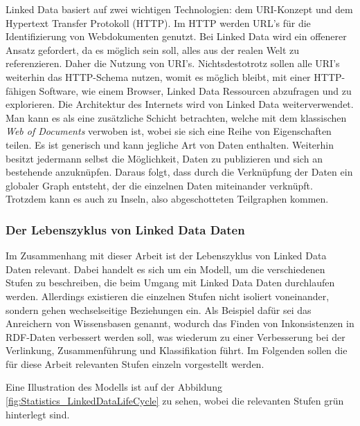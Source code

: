 \documentclass[11pt]{article}
\newcommand{\com}[1]{\marginpar{\em {\small{#1}}}} %
\begin{document}
Linked Data basiert auf zwei wichtigen Technologien: dem URI-Konzept und dem Hypertext Transfer Protokoll (HTTP)\cite{HTTP-SPEC}. Im HTTP werden URL's für die Identifizierung von Webdokumenten genutzt. Bei Linked Data wird ein offenerer Ansatz gefordert, da es möglich sein soll, alles aus der realen Welt zu referenzieren. Daher die Nutzung von URI's. Nichtsdestotrotz sollen alle URI's weiterhin das HTTP-Schema nutzen, womit es möglich bleibt, mit einer HTTP-fähigen Software, wie einem Browser, Linked Data Ressourcen abzufragen und zu explorieren. Die Architektur des Internets wird  von Linked Data weiterverwendet. Man kann es als eine zusätzliche Schicht betrachten, welche mit dem klassischen \textit{Web of Documents} verwoben ist, wobei sie sich eine Reihe von Eigenschaften teilen. Es ist generisch und kann jegliche Art von Daten enthalten. Weiterhin besitzt jedermann selbst die Möglichkeit, Daten zu publizieren und sich an bestehende anzuknüpfen. Daraus folgt, dass durch die Verknüpfung der Daten ein globaler Graph entsteht, der die einzelnen Daten miteinander verknüpft. Trotzdem kann es auch zu Inseln, also abgeschotteten Teilgraphen kommen. \cite{LINKEDDATA-ABOUT}


%
%
\subsubsection{Der Lebenszyklus von Linked Data Daten}

Im Zusammenhang mit dieser Arbeit ist der Lebenszyklus\com{Linked Data Life Cycle} von Linked Data Daten relevant. Dabei handelt es sich um ein Modell, um die verschiedenen Stufen zu beschreiben, die beim Umgang mit Linked Data Daten durchlaufen werden. Allerdings existieren die einzelnen Stufen nicht isoliert voneinander, sondern gehen wechselseitige Beziehungen ein. Als Beispiel dafür sei das Anreichern von Wissensbasen genannt, wodurch das Finden von Inkonsistenzen in RDF-Daten verbessert werden soll, was wiederum zu einer Verbesserung bei der Verlinkung, Zusammenführung und Klassifikation führt. Im Folgenden sollen die für diese Arbeit relevanten Stufen einzeln vorgestellt werden. \cite[S. 3]{LINKEDDATA-LIFECYCLE}

\newpage
\noindent
Eine Illustration des Modells ist auf der Abbildung \ref{fig:Statistics_LinkedDataLifeCycle} zu sehen, wobei die relevanten Stufen grün hinterlegt sind. \\
\end{document}
